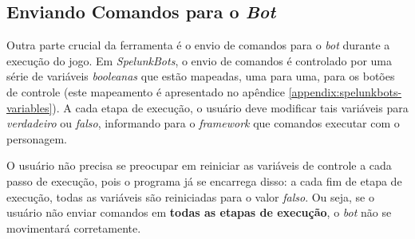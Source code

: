 \subsection{Enviando Comandos para o \textit{Bot}}
Outra parte crucial da ferramenta é o envio de comandos para o \textit{bot}
durante a execução do jogo. Em \textit{SpelunkBots}, o envio de comandos é
controlado por uma série de variáveis \textit{booleanas} que estão mapeadas, uma
para uma, para os botões de controle (este mapeamento é apresentado no apêndice
\ref{appendix:spelunkbots-variables}). A cada etapa de execução, o usuário deve
modificar tais variáveis para \textit{verdadeiro} ou \textit{falso}, informando
para o \textit{framework} que comandos executar com o personagem.

O usuário não precisa se preocupar em reiniciar as variáveis de controle a cada
passo de execução, pois o programa já se encarrega disso: a cada fim de etapa de
execução, todas as variáveis são reiniciadas para o valor \textit{falso}. Ou
seja, se o usuário não enviar comandos em \textbf{todas as etapas de execução},
o \textit{bot} não se movimentará corretamente.
